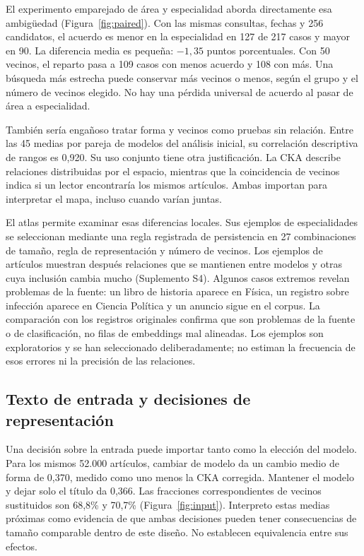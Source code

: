 \documentclass[12pt]{article}
\begin{document}
El experimento emparejado de área y especialidad aborda directamente esa ambigüedad (Figura~\ref{fig:paired}). Con las mismas consultas, fechas y 256 candidatos, el acuerdo es menor en la especialidad en 127 de 217 casos y mayor en 90. La diferencia media es pequeña: $-1{,}35$ puntos porcentuales. Con 50 vecinos, el reparto pasa a 109 casos con menos acuerdo y 108 con más. Una búsqueda más estrecha puede conservar más vecinos o menos, según el grupo y el número de vecinos elegido. No hay una pérdida universal de acuerdo al pasar de área a especialidad.

También sería engañoso tratar forma y vecinos como pruebas sin relación. Entre las 45 medias por pareja de modelos del análisis inicial, su correlación descriptiva de rangos es 0,920. Su uso conjunto tiene otra justificación. La CKA describe relaciones distribuidas por el espacio, mientras que la coincidencia de vecinos indica si un lector encontraría los mismos artículos. Ambas importan para interpretar el mapa, incluso cuando varían juntas.

El atlas permite examinar esas diferencias locales. Sus ejemplos de especialidades se seleccionan mediante una regla registrada de persistencia en 27 combinaciones de tamaño, regla de representación y número de vecinos. Los ejemplos de artículos muestran después relaciones que se mantienen entre modelos y otras cuya inclusión cambia mucho (Suplemento S4). Algunos casos extremos revelan problemas de la fuente: un libro de historia aparece en Física, un registro sobre infección aparece en Ciencia Política y un anuncio sigue en el corpus. La comparación con los registros originales confirma que son problemas de la fuente o de clasificación, no filas de embeddings mal alineadas. Los ejemplos son exploratorios y se han seleccionado deliberadamente; no estiman la frecuencia de esos errores ni la precisión de las relaciones.

\subsection{Texto de entrada y decisiones de representación}
Una decisión sobre la entrada puede importar tanto como la elección del modelo. Para los mismos 52.000 artículos, cambiar de modelo da un cambio medio de forma de 0,370, medido como uno menos la CKA corregida. Mantener el modelo y dejar solo el título da 0,366. Las fracciones correspondientes de vecinos sustituidos son 68,8\% y 70,7\% (Figura~\ref{fig:input}). Interpreto estas medias próximas como evidencia de que ambas decisiones pueden tener consecuencias de tamaño comparable dentro de este diseño. No establecen equivalencia entre sus efectos.
\end{document}

